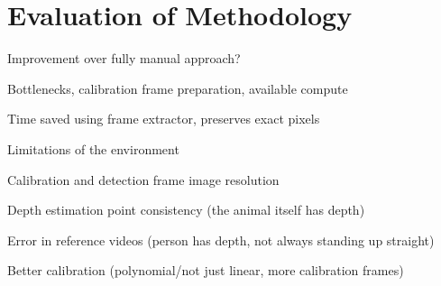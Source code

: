 \section{Evaluation of Methodology}

Improvement over fully manual approach?

Bottlenecks, calibration frame preparation, available compute

Time saved using frame extractor, preserves exact pixels

Limitations of the environment

Calibration and detection frame image resolution

Depth estimation point consistency (the animal itself has depth)

Error in reference videos (person has depth, not always standing up straight)

Better calibration (polynomial/not just linear, more calibration frames)